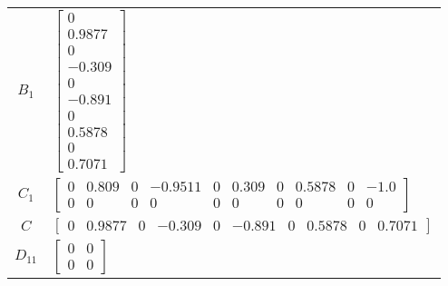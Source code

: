\begin{tabular}{cl}
 $B_{1}$  & $\left[\begin{matrix}0\\0.9877\\0\\-0.309\\0\\-0.891\\0\\0.5878\\0\\0.7071\end{matrix}\right]$                                                                                                                                                                                                                                                                                                                                                                                                  \\
 $C_{1}$  & $\left[\begin{matrix}0 & 0.809 & 0 & -0.9511 & 0 & 0.309 & 0 & 0.5878 & 0 & -1.0\\0 & 0 & 0 & 0 & 0 & 0 & 0 & 0 & 0 & 0\end{matrix}\right]$                                                                                                                                                                                                                                                                                                                                                     \\
   $C$    & $\left[\begin{matrix}0 & 0.9877 & 0 & -0.309 & 0 & -0.891 & 0 & 0.5878 & 0 & 0.7071\end{matrix}\right]$                                                                                                                                                                                                                                                                                                                                                                                         \\
 $D_{11}$ & $\left[\begin{matrix}0 & 0\\0 & 0\end{matrix}\right]$                                                                                                                                                                                                                                                                                                                                                                                                                                           \\

\end{tabular}
